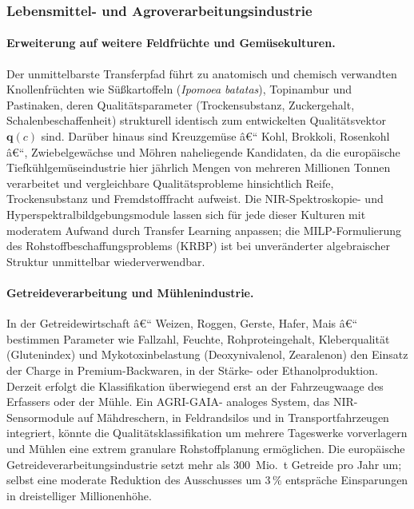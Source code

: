 ﻿\documentclass[12pt,a4paper]{article}
\theoremstyle{plain}
\theoremstyle{definition}
\begin{document}
	\subsubsection{Lebensmittel- und Agroverarbeitungsindustrie}

	\paragraph{Erweiterung auf weitere Feldfrüchte und Gemüsekulturen.}
	Der unmittelbarste Transferpfad führt zu anatomisch und chemisch verwandten
	Knollenfrüchten wie Süßkartoffeln (\textit{Ipomoea batatas}), Topinambur
	und Pastinaken, deren Qualitätsparameter (Trockensubstanz, Zuckergehalt,
	Schalenbeschaffenheit) strukturell identisch zum entwickelten Qualitätsvektor
	$\mathbf{q}(c)$ sind. Darüber hinaus sind Kreuzgemüse â€“ Kohl, Brokkoli,
	Rosenkohl â€“, Zwiebelgewächse und Möhren naheliegende Kandidaten, da die
	europäische Tiefkühlgemüseindustrie hier jährlich Mengen von mehreren
	Millionen Tonnen verarbeitet und vergleichbare Qualitätsprobleme hinsichtlich
	Reife, Trockensubstanz und Fremdstofffracht aufweist. Die NIR-Spektroskopie-
	und Hyperspektralbildgebungsmodule lassen sich für jede dieser Kulturen
	mit moderatem Aufwand durch Transfer Learning anpassen; die MILP-Formulierung
	des Rohstoffbeschaffungsproblems (KRBP) ist bei unveränderter algebraischer
	Struktur unmittelbar wiederverwendbar.

	\paragraph{Getreideverarbeitung und Mühlenindustrie.}
	In der Getreidewirtschaft â€“ Weizen, Roggen, Gerste, Hafer, Mais â€“ bestimmen
	Parameter wie Fallzahl, Feuchte, Rohproteingehalt, Kleberqualität
	(Glutenindex) und Mykotoxinbelastung (Deoxynivalenol, Zearalenon) den
	Einsatz der Charge in Premium-Back\-waren, in der Stärke- oder
	Ethanolproduktion. Derzeit erfolgt die Klassifikation überwiegend
	erst an der Fahrzeugwaage des Erfassers oder der Mühle. Ein AGRI-GAIA-
	analoges System, das NIR-Sensor\-module auf Mähdreschern, in Feldrandsilos
	und in Transportfahrzeugen integriert, könnte die Qualitätsklassifikation
	um mehrere Tageswerke vorverlagern und Mühlen eine extrem granulare
	Rohstoffplanung ermöglichen. Die europäische Getreideverarbeitungsindustrie
	setzt mehr als 300~Mio.~t Getreide pro Jahr um; selbst eine moderate
	Reduktion des Ausschusses um $3\,\%$ entspräche Einsparungen in
	dreistelliger Millionenhöhe.
\end{document}
